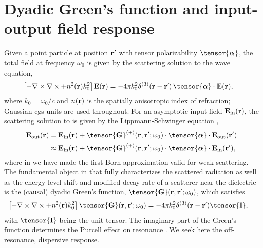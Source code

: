 \documentclass[preprint,aps,pra,onecolumn]{revtex4-1} %
\newcommand{\inp}{{\rm in}}
\newcommand{\out}{{\rm out}}
\newcommand{\unittens}{\tensor{\mathbf{I}}}
\begin{document}
\section{Dyadic Green's function and input-output field response}

Given a point particle at position $\mathbf{r}'$ with tensor polarizability $\tensor{\boldsymbol{\alpha}}$, the total field  at frequency $\omega_0$ is given by the scattering solution to the wave equation, 
	\begin{align}\label{Eq::WaveEquationSource}
		\left[ - \nabla \times\nabla \times + n^2(\br)k_0^2 \right] \mathbf{E}(\br) &= -4\pi  k_0^2 \delta^{(3)}(\br-\br')\,  \tensor{\boldsymbol{\alpha}}\cdot \mathbf{E}(\br),
	\end{align}
where $k_0=\omega_0/c$ and $n(\mathbf{r})$ is the spatially anisotropic index of refraction; Gaussian-cgs units are used throughout.  For an asymptotic input field $\mathbf{E}_{\inp}(\br)$, the scattering solution to  is given by the Lippmann-Schwinger equation \cite{wubs_multiple-scattering_2004},
	\begin{align}
		\mathbf{E}_{\out}(\br) &=\mathbf{E}_{\inp}(\br)+\tensor{\mathbf{G}}^{(+)}(\br , \br'; \omega_0)\cdot 
\tensor{\boldsymbol{\alpha}}\cdot \mathbf{E}_{\out}(\br')\\
		&\approx \mathbf{E}_{\inp}(\br)+ \tensor{\mathbf{G}}^{(+)}(\br , \br'; \omega_0) \cdot 
\tensor{\boldsymbol{\alpha}}\cdot \mathbf{E}_{\inp}(\br'), \label{Eq::ScatteredField}
	\end{align}
where in  we have made the first Born approximation valid for weak scattering. The fundamental object in that fully characterizes the scattered radiation as well as the energy level shift and modified decay rate of a scatterer near the dielectric is the (causal) dyadic Green's function, $\tensor{\mathbf{G}}(\br, \br';\omega_0)$, which satisfies
	\begin{align} \label{Eq::GreensDiffEq}
		\left[ -\nabla\times\nabla\times + n^2(\mbf{r}) k_0^2 \right] \tensor{\mathbf{G}}(\br, \br';\omega_0) &= -4\pi 
k_0^2 \delta^{(3)}(\mathbf{r}-\mathbf{r}') \unittens,
	\end{align}
with $\unittens$ being the unit tensor.  The imaginary part of the Green's function determines the Purcell effect on resonance \cite{}.  We seek here the off-resonance, dispersive response.  
\end{document}
